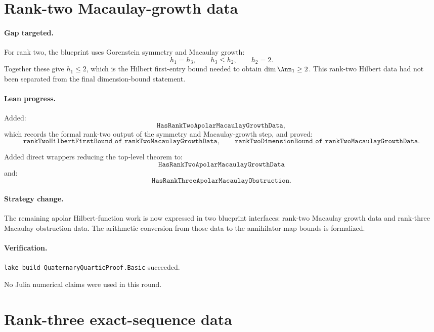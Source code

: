 \documentclass[11pt]{article}
\begin{document}
\section*{Rank-two Macaulay-growth data}

\paragraph{Gap targeted.}
For rank two, the blueprint uses Gorenstein symmetry and Macaulay growth:
\[
h_1=h_3,\qquad h_3\le h_2,\qquad h_2=2.
\]
Together these give \(h_1\le2\), which is the Hilbert first-entry bound needed
to obtain \(\dim\Ann_1\ge2\).  This rank-two Hilbert data had not been
separated from the final dimension-bound statement.

\paragraph{Lean progress.}
Added:
\[
\texttt{HasRankTwoApolarMacaulayGrowthData},
\]
which records the formal rank-two output of the symmetry and Macaulay-growth
step, and proved:
\[
\texttt{rankTwoHilbertFirstBound\_of\_rankTwoMacaulayGrowthData},
\qquad
\texttt{rankTwoDimensionBound\_of\_rankTwoMacaulayGrowthData}.
\]

Added direct wrappers reducing the top-level theorem to:
\[
\texttt{HasRankTwoApolarMacaulayGrowthData}
\]
and:
\[
\texttt{HasRankThreeApolarMacaulayObstruction}.
\]

\paragraph{Strategy change.}
The remaining apolar Hilbert-function work is now expressed in two blueprint
interfaces: rank-two Macaulay growth data and rank-three Macaulay obstruction
data.  The arithmetic conversion from those data to the annihilator-map bounds
is formalized.

\paragraph{Verification.}
\texttt{lake build QuaternaryQuarticProof.Basic} succeeded.

No Julia numerical claims were used in this round.

\section*{Rank-three exact-sequence data}
\end{document}
